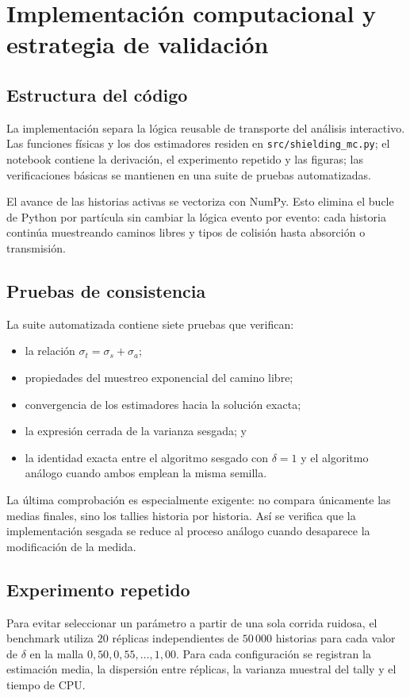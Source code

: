 \documentclass[11pt]{article}
\begin{document}
\section{Implementación computacional y estrategia de validación}
\subsection{Estructura del código}
La implementación separa la lógica reusable de transporte del análisis interactivo. Las funciones físicas y los dos estimadores residen en \texttt{src/shielding\_mc.py}; el notebook contiene la derivación, el experimento repetido y las figuras; las verificaciones básicas se mantienen en una suite de pruebas automatizadas.

El avance de las historias activas se vectoriza con NumPy. Esto elimina el bucle de Python por partícula sin cambiar la lógica evento por evento: cada historia continúa muestreando caminos libres y tipos de colisión hasta absorción o transmisión.

\subsection{Pruebas de consistencia}
La suite automatizada contiene siete pruebas que verifican:
\begin{itemize}[leftmargin=1.6em]
    \item la relación $\sigma_t=\sigma_s+\sigma_a$;
    \item propiedades del muestreo exponencial del camino libre;
    \item convergencia de los estimadores hacia la solución exacta;
    \item la expresión cerrada de la varianza sesgada; y
    \item la identidad exacta entre el algoritmo sesgado con $\delta=1$ y el algoritmo análogo cuando ambos emplean la misma semilla.
\end{itemize}

La última comprobación es especialmente exigente: no compara únicamente las medias finales, sino los tallies historia por historia. Así se verifica que la implementación sesgada se reduce al proceso análogo cuando desaparece la modificación de la medida.

\subsection{Experimento repetido}
Para evitar seleccionar un parámetro a partir de una sola corrida ruidosa, el benchmark utiliza $20$ réplicas independientes de $50\,000$ historias para cada valor de $\delta$ en la malla $0{,}50,0{,}55,\ldots,1{,}00$. Para cada configuración se registran la estimación media, la dispersión entre réplicas, la varianza muestral del tally y el tiempo de CPU.
\end{document}

